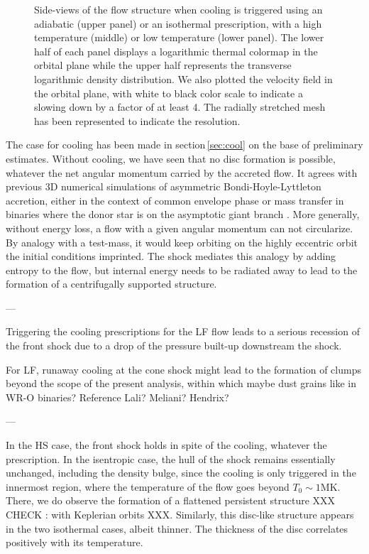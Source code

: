 \documentclass{aa}
\begin{document}
\begin{figure}
\begin{subfigure}{0.5\textwidth}
\begin{center}
\label{fig:subim2}
\end{center}
\end{subfigure}
\caption{Side-views of the flow structure when cooling is triggered using an adiabatic (upper panel) or an isothermal prescription, with a high temperature (middle) or low temperature (lower panel). The lower half of each panel displays a logarithmic thermal colormap in the orbital plane while the upper half represents the transverse logarithmic density distribution. We also plotted the velocity field in the orbital plane, with white to black color scale to indicate a slowing down by a factor of at least 4. The radially stretched mesh has been represented to indicate the resolution.}
\label{fig:cooled_ones}
\end{figure}

The case for cooling has been made in section\,\ref{sec:cool} on the base of preliminary estimates. Without cooling, we have seen that no disc formation is possible, whatever the net angular momentum carried by the accreted flow. It agrees with previous 3D numerical simulations of asymmetric Bondi-Hoyle-Lyttleton accretion, either in the context of common envelope phase \citep{MacLeod2014} or mass transfer in binaries where the donor star is on the asymptotic giant branch \citep{Saladino2018}. More generally, without energy loss, a flow with a given angular momentum can not circularize. By analogy with a test-mass, it would keep orbiting on the highly eccentric orbit the initial conditions imprinted. The shock mediates this analogy by adding entropy to the flow, but internal energy needs to be radiated away to lead to the formation of a centrifugally supported structure.

---

Triggering the cooling prescriptions for the LF flow leads to a serious recession of the front shock due to a drop of the pressure built-up downstream the shock.

For LF, runaway cooling at the cone shock might lead to the formation of clumps beyond the scope of the present analysis, within which maybe dust grains like in WR-O binaries? Reference Lali? Meliani? Hendrix?

---

In the HS case, the front shock holds in spite of the cooling, whatever the prescription. In the isentropic case, the hull of the shock remains essentially unchanged, including the density bulge, since the cooling is only triggered in the innermost region, where the temperature of the flow goes beyond $T_0\sim 1$MK. There, we do observe the formation of a flattened persistent structure XXX CHECK : with Keplerian orbits XXX. Similarly, this disc-like structure appears in the two isothermal cases, albeit thinner. The thickness of the disc correlates positively with its temperature. 
\end{document}
